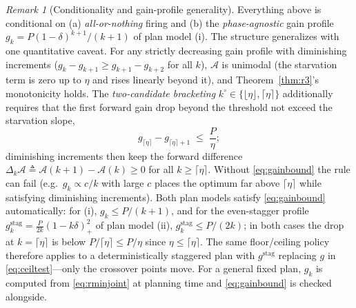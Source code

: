 \documentclass[twocolumn,3p,times,procedia]{elsarticle}
\theoremstyle{plain}
\theoremstyle{remark}
\newtheorem{remark}{Remark}
\begin{document}
\begin{remark}[Conditionality and gain-profile generality]
\label{rem:gainprofile}
Everything above is conditional on (a) \emph{all-or-nothing} firing and
(b) the \emph{phase-agnostic} gain profile
$g_k=P(1-\delta)^{k+1}/(k+1)$ of plan model (i). The structure
generalizes with one quantitative caveat. For any strictly decreasing
gain profile with diminishing increments ($g_k-g_{k+1}\ge
g_{k+1}-g_{k+2}$ for all $k$), $\mathcal{A}$ is unimodal
(the starvation term is zero up to $\eta$ and rises linearly beyond
it), and Theorem~\ref{thm:r3}'s monotonicity holds. The
\emph{two-candidate bracketing} $k^\circ\in\{\lfloor\eta\rfloor,
\lceil\eta\rceil\}$ additionally requires that the first forward gain
drop beyond the threshold not exceed the starvation slope,
\begin{equation}\label{eq:gainbound}
g_{\lceil\eta\rceil}-g_{\lceil\eta\rceil+1}\;\le\;\frac{P}{\eta};
\end{equation}
diminishing increments then keep the forward difference
$\Delta_k\mathcal{A}\triangleq\mathcal{A}(k{+}1)-\mathcal{A}(k)\ge0$ for all
$k\ge\lceil\eta\rceil$. Without \eqref{eq:gainbound} the rule can fail
(e.g.\ $g_k\propto c/k$ with large $c$ places the optimum far above
$\lceil\eta\rceil$ while satisfying diminishing increments). Both plan
models satisfy \eqref{eq:gainbound} automatically: for (i), $g_k\le
P/(k+1)$, and for the even-stagger profile
$g^{\mathrm{stag}}_k=\tfrac{P}{2k}(1-k\delta)_+^2$ of plan model (ii),
$g^{\mathrm{stag}}_k\le P/(2k)$; in
both cases the drop at $k=\lceil\eta\rceil$ is below
$P/\lceil\eta\rceil\le P/\eta$ since
$\eta\le\lceil\eta\rceil$. The same floor/ceiling policy therefore
applies to a deterministically staggered plan with $g^{\mathrm{stag}}$
replacing $g$ in \eqref{eq:ceiltest}---only the crossover points move.
For a general fixed plan, $g_k$ is computed from \eqref{eq:rminjoint}
at planning time and \eqref{eq:gainbound} is checked alongside.
\end{remark}
\end{document}
